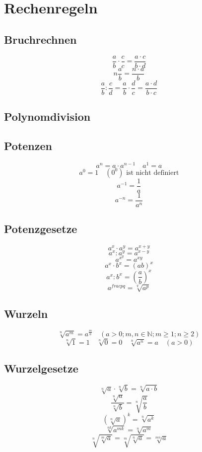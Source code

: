 \section{Rechenregeln}
\subsection{Bruchrechnen}
\[ \boxed{\frac{a}{b} \cdot \frac{c}{c} = \frac{a \cdot c}{b \cdot d}} \]
\[ \boxed{n \frac{a}{b} = \frac{n \cdot a}{b}} \]
\[ \boxed{\frac{a}{b} : \frac{c}{d} = \frac{a}{b} \cdot \frac{d}{c} = \frac{a \cdot d}{b \cdot c}} \]

\subsection{Polynomdivision}


\subsection{Potenzen}
\[ \boxed{a^n = a \cdot a^{n-1} \quad a^1 = a} \]
\[ \boxed{a^0 = 1 \quad (0^0)\text{ ist nicht definiert}} \]
\[ \boxed{a^{-1} = \frac{1}{a}} \]
\[ \boxed{a^{-n} = \frac{1}{a^n}} \]

\subsection{Potenzgesetze}
\[ \boxed{a^x \cdot a^y = a^{x+y}} \]
\[ \boxed{a^x : a^y = a^{x-y}} \]
\[ \boxed{a^{x^y} = a^{xy}} \]
\[ \boxed{a^x \cdot b^x = \left(ab\right)^x} \]
\[ \boxed{a^x : b^x = (\frac{a}{b})^x} \]
\[ \boxed{a^{frac{p}{q}} = \sqrt[q]{a^p}} \]

\subsection{Wurzeln}
\[ \boxed{\sqrt[n]{a^m} = a^{\frac{m}{n}} \quad (a>0; m, n \in \mathbb{N}; m \geq 1; n \geq 2)} \]
\[ \boxed{\sqrt[n]{1}=1 \quad \sqrt[n]{0}=0 \quad \sqrt[n]{a^n}=a \quad (a>0)} \]

\subsection{Wurzelgesetze}
\[ \boxed{\sqrt[n]{a}\cdot \sqrt[n]{b}=\sqrt[n]{a\cdot b}} \]
\[ \boxed{\frac{\sqrt[n]{a}}{\sqrt[n]{b}}=\sqrt[n]{\frac{a}{b}}} \]
\[ \boxed{\left(\sqrt[n]{a}\right)^k=\sqrt[n]{a^k}} \]
\[ \boxed{\sqrt[nk]{a^{mk}}=\sqrt[n]{a^m}} \]
\[ \boxed{\sqrt[n]{\sqrt[m]{a}}=\sqrt[m]{\sqrt[n]{a}}=\sqrt[mn]{a}} \]

